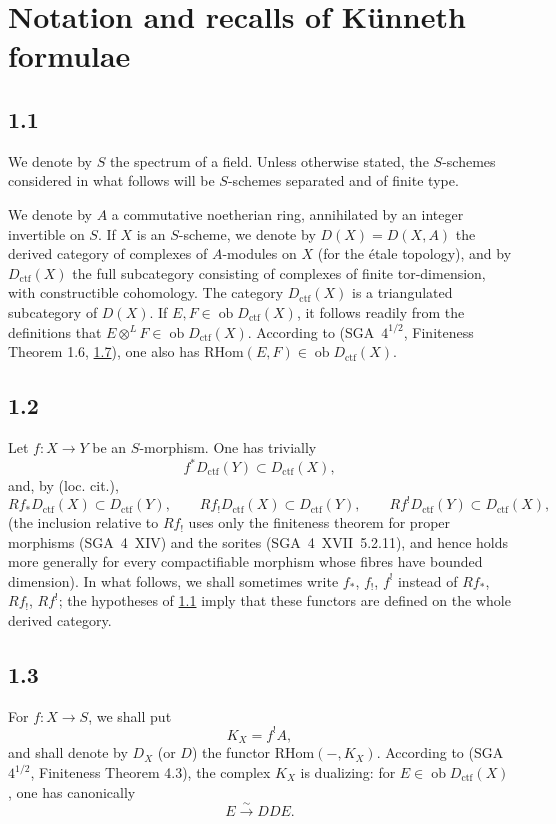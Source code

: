 \documentclass[11pt]{article}
\newcommand{\ob}{\operatorname{ob}}
\providecommand{\RHom}{\mathrm{RHom}}
\providecommand{\ctf}{\mathrm{ctf}}
\providecommand{\RHom}{\mathrm{RHom}}
\providecommand{\ob}{\operatorname{ob}}
\providecommand{\RHom}{\mathrm R\mathcal{H}om}
\providecommand{\RHom}{\mathrm{RHom}}
\begin{document}
\section{Notation and recalls of Künneth formulae}

\subsection*{1.1}\label{sga5:III:subsection:1.1}
We denote by $S$ the spectrum of a field. Unless otherwise stated, the $S$-schemes considered in what follows will be $S$-schemes separated and of finite type.

We denote by $A$ a commutative noetherian ring, annihilated by an integer invertible on $S$. If $X$ is an $S$-scheme, we denote by $D(X)=D(X,A)$ the derived category of complexes of $A$-modules on $X$ (for the étale topology), and by $D_{\ctf}(X)$ the full subcategory consisting of complexes of finite tor-dimension, with constructible cohomology. The category $D_{\ctf}(X)$ is a triangulated subcategory of $D(X)$. If $E,F\in\ob D_{\ctf}(X)$, it follows readily from the definitions that $E\otimes^L F\in\ob D_{\ctf}(X)$. According to (SGA~$4^{1/2}$, Finiteness Theorem 1.6, \hyperref[sga5:III:subsection:1.7]{1.7}), one also has $\RHom(E,F)\in\ob D_{\ctf}(X)$.

\subsection*{1.2}\label{sga5:III:subsection:1.2}
Let $f:X\to Y$ be an $S$-morphism. One has trivially
\[
f^{*}D_{\ctf}(Y) \subset D_{\ctf}(X),
\]
and, by (loc. cit.),
\[
Rf_{*}D_{\ctf}(X) \subset D_{\ctf}(Y),\qquad
Rf_{!}D_{\ctf}(X) \subset D_{\ctf}(Y),\qquad
Rf^{!}D_{\ctf}(Y) \subset D_{\ctf}(X),
\]
(the inclusion relative to $Rf_{!}$ uses only the finiteness theorem for proper morphisms (SGA~4~XIV) and the sorites (SGA~4~XVII~5.2.11), and hence holds more generally for every compactifiable morphism whose fibres have bounded dimension). In what follows, we shall sometimes write $f_{*}$, $f_{!}$, $f^{!}$ instead of $Rf_{*}$, $Rf_{!}$, $Rf^{!}$; the hypotheses of \hyperref[sga5:III:subsection:1.1]{1.1} imply that these functors are defined on the whole derived category.

\subsection*{1.3}\label{sga5:III:subsection:1.3}
For $f:X\to S$, we shall put
\[
K_X=f^{!}A,
\]
and shall denote by $D_X$ (or $D$) the functor $\RHom(-,K_X)$. According to (SGA~$4^{1/2}$, Finiteness Theorem 4.3), the complex $K_X$ is dualizing: for $E\in\ob D_{\ctf}(X)$, one has canonically
\[
E \xrightarrow{\sim} DDE.
\]
\end{document}
